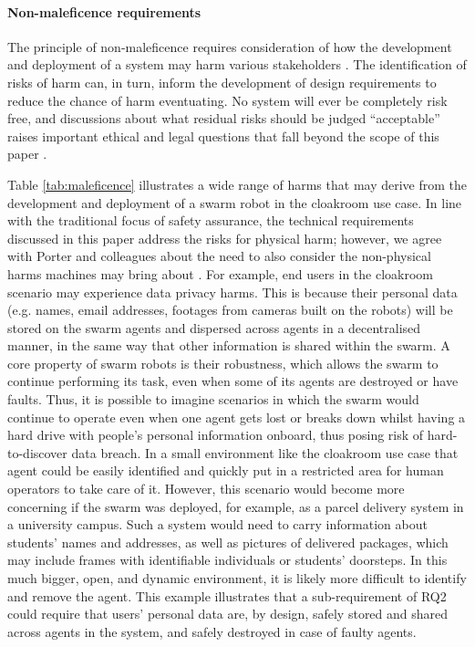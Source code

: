 \documentclass[lettersize,journal]{IEEEtran}
\begin{document}
\paragraph*{Non-maleficence requirements}
The principle of non-maleficence requires consideration of how the development and deployment of a system may harm various stakeholders \cite{Porter2022}. The identification of risks of harm can, in turn, inform the development of design requirements to reduce the chance of harm eventuating. No system will ever be completely risk free, and discussions about what residual risks should be judged ``acceptable” raises important ethical and legal questions that fall beyond the scope of this paper \cite{fraser2021residual}.

Table \ref{tab:maleficence} illustrates a wide range of harms that may derive from the development and deployment of a swarm robot in the cloakroom use case. In line with the traditional focus of safety assurance, the technical requirements discussed in this paper address the risks for physical harm; however, we agree with Porter and colleagues about the need to also consider  the non-physical harms machines may bring about \cite{Porter2022}. For example, end users in the cloakroom scenario may experience data privacy harms. This is because their personal data (e.g. names, email addresses, footages from cameras built on the robots) will be stored on the swarm agents and dispersed across agents in a decentralised manner, in the same way that other information is shared within the swarm. A core property of swarm robots is their robustness, which allows the swarm to continue performing its task, even when some of its agents are destroyed or have faults. Thus, it is possible to imagine scenarios in which the swarm would continue to operate even when one agent gets lost or breaks down whilst having a hard drive with people’s personal information onboard, thus posing risk of hard-to-discover data breach. In a small environment like the cloakroom use case that agent could be easily identified and quickly put in a restricted area for human operators to take care of it. However, this scenario would become more concerning if the swarm was deployed, for example, as a parcel delivery system in a university campus. Such a system would need to carry information about students’ names and addresses, as well as pictures of delivered packages, which may include frames with identifiable individuals or students’ doorsteps. In this much bigger, open, and dynamic environment, it is likely more difficult to identify and remove the agent. This example illustrates that a sub-requirement of RQ2 could require that users’ personal data are, by design, safely stored and shared across agents in the system, and safely destroyed in case of faulty agents.  
\\
\end{document}
